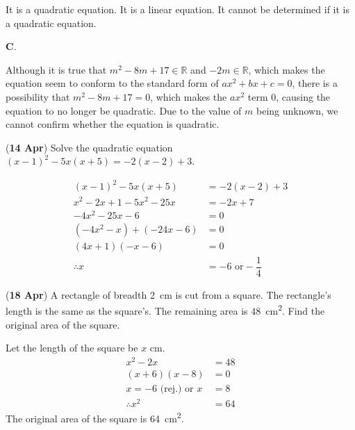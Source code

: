 \documentclass[12pt, answers]{exam}
\newcommand{\reals}{\mathbb{R}}
\renewcommand{\frac}[2]{\dfrac{#1}{#2}}
\begin{document}
\begin{questions}
	\begin{choices}
		\choice It is a quadratic equation.
		\choice It is a linear equation.
		\choice It cannot be determined if it is a quadratic equation.
	\end{choices}

	\begin{solution}
		\textbf{C}.

		Although it is true that \(m^{2} - 8m + 17 \in \reals\) and \(-2m \in \reals\),
		which makes the equation seem to conform to the standard form of
		\(ax^{2} + bx + c = 0\), there is a possibility that
		\(m^{2} - 8m + 17 = 0\), which makes the \(ax^{2}\) term \(0\),
		causing the equation to no longer be quadratic. Due to the value of \(m\) being unknown, we cannot confirm
		whether the equation is quadratic.
	\end{solution}

	\question (\textbf{14 Apr}) Solve the quadratic equation
	\((x - 1)^{2} - 5x(x + 5) = -2(x - 2) + 3\).
	\begin{solution}
		\begin{align*}
			(x - 1)^{2} - 5x(x + 5)                          & = -2(x - 2) + 3              \\
			x^{2} - 2x + 1 - 5x^{2} - 25x                    & = -2x + 7                    \\
			-4x^{2} - 25x - 6                                & = 0                          \\
			\left(-4x^{2} - x\right) + \left(-24x - 6\right) & = 0                          \\
			(4x + 1)(- x - 6)                                & = 0                          \\
			\therefore x                                     & = -6 \text{ or} -\frac{1}{4}
		\end{align*}
	\end{solution}

	\question (\textbf{18 Apr}) A rectangle of breadth \qty{2}{\centi\metre} is cut from a square.
	The rectangle's length is the same as the square's.
	The remaining area is \qty{48}{\square\centi\metre}.
	Find the original area of the square.
	\begin{solution}
		Let the length of the square be \(x\) \si{\centi\metre}.
		\begin{align*}
			x^{2} - 2x                  & = 48 \\
			(x + 6)(x - 8)              & = 0  \\
			x = -6 \text{ (rej.) or } x & = 8  \\
			\therefore  x^{2}           & = 64
		\end{align*}
		The original area of the square is \qty{64}{\square\centi\metre}.
	\end{solution}


\end{questions}
\end{document}
